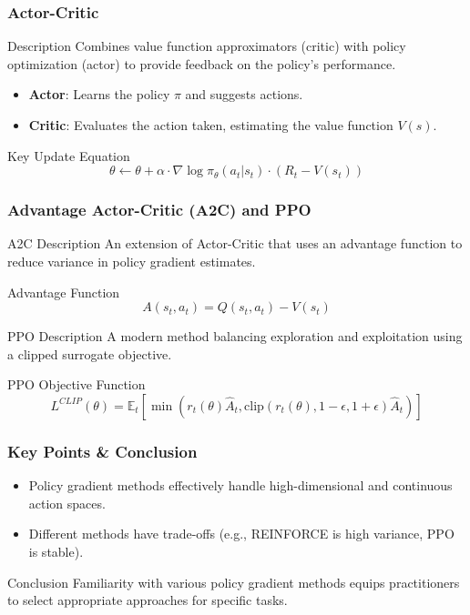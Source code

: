 \documentclass[aspectratio=169]{beamer}
\begin{document}
\begin{frame}[fragile]
    \frametitle{Actor-Critic}
    \begin{block}{Description}
        Combines value function approximators (critic) with policy optimization (actor) to provide feedback on the policy's performance.
    \end{block}
    \begin{itemize}
        \item \textbf{Actor}: Learns the policy \( \pi \) and suggests actions.
        \item \textbf{Critic}: Evaluates the action taken, estimating the value function \( V(s) \).
    \end{itemize}
    \begin{block}{Key Update Equation}
        \[
        \theta \gets \theta + \alpha \cdot \nabla \log \pi_\theta(a_t | s_t) \cdot (R_t - V(s_t))
        \]
    \end{block}
\end{frame}

\begin{frame}[fragile]
    \frametitle{Advantage Actor-Critic (A2C) and PPO}
    \begin{block}{A2C Description}
        An extension of Actor-Critic that uses an advantage function to reduce variance in policy gradient estimates.
    \end{block}
    \begin{block}{Advantage Function}
        \[
        A(s_t, a_t) = Q(s_t, a_t) - V(s_t)
        \]
    \end{block}
    \begin{block}{PPO Description}
        A modern method balancing exploration and exploitation using a clipped surrogate objective.
    \end{block}
    \begin{block}{PPO Objective Function}
        \[
        L^{CLIP}(\theta) = \mathbb{E}_t \left[\min \left( r_t(\theta) \hat{A}_t, \text{clip}(r_t(\theta), 1 - \epsilon, 1 + \epsilon) \hat{A}_t \right) \right]
        \]
    \end{block}
\end{frame}

\begin{frame}[fragile]
    \frametitle{Key Points & Conclusion}
    \begin{itemize}
        \item Policy gradient methods effectively handle high-dimensional and continuous action spaces.
        \item Different methods have trade-offs (e.g., REINFORCE is high variance, PPO is stable).
    \end{itemize}
    \begin{block}{Conclusion}
        Familiarity with various policy gradient methods equips practitioners to select appropriate approaches for specific tasks.
    \end{block}
\end{frame}
\end{document}
